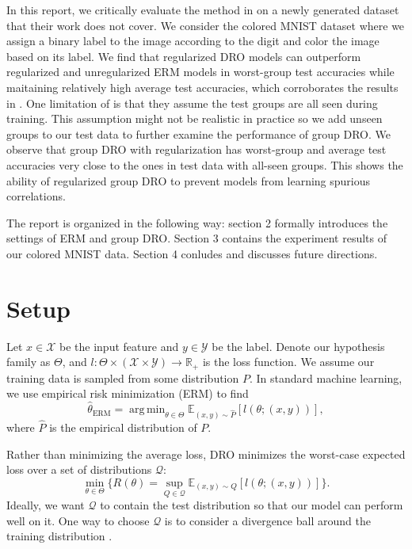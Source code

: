 \documentclass{article}
\DeclareMathOperator{\erm}{ERM}
\DeclareMathOperator*{\argmin}{arg\,min}
\begin{document}
In this report, we critically evaluate the method in \cite{groupdro} on a newly generated dataset that their work does not cover. We consider the colored MNIST dataset where we assign a binary label to the image according to the digit and color the image based on its label. We find that regularized DRO models can outperform regularized and unregularized ERM models in worst-group test accuracies while maitaining relatively high average
test accuracies, which corroborates the results in \cite{groupdro}. One limitation of \cite{groupdro} is that they assume the test groups are all seen during training. This assumption might not be realistic in practice so we add unseen groups to our test data to further examine the performance of group DRO. We observe that group DRO with regularization has worst-group and average test accuracies very close to the ones in test data with all-seen groups. This shows the ability of regularized group DRO to prevent models from learning spurious correlations.

The report is organized in the following way: section 2 formally introduces the settings of ERM and group DRO. Section 3 contains the experiment results of our colored MNIST data. Section 4 conludes and discusses future directions.

\section{Setup}
Let $x\in\mathcal{X}$ be the input feature and $y\in\mathcal{Y}$ be the label. Denote our hypothesis family as $\Theta$, and $l:\Theta\times(\mathcal{X}\times\mathcal{Y})\rightarrow\mathbb{R}_+$ is the loss function. We assume our training data is sampled from some distribution $P$. In standard machine learning, we use  empirical risk minimization (ERM) to find
\begin{equation}
    \hat{\theta}_{\erm}=\argmin_{\theta\in\Theta}\mathbb{E}_{(x,y)\sim\hat{P}}[l(\theta;(x,y))],
\end{equation}
where $\hat{P}$ is the empirical distribution of $P$.

Rather than minimizing the average loss, DRO  minimizes the worst-case expected loss over a set of distributions $\mathcal{Q}$:
\begin{equation}\label{dro}
    \min_{\theta\in\Theta}\{R(\theta)=\sup_{Q\in\mathcal{Q}}\mathbb{E}_{(x,y)\sim Q}[l(\theta;(x,y))]\}.
\end{equation}
Ideally, we want $\mathcal{Q}$ to contain the test distribution so that our model can perform well on it. One way to choose $\mathcal{Q}$ is to consider a divergence ball around the training distribution \cite{duchi}. 
\end{document}
